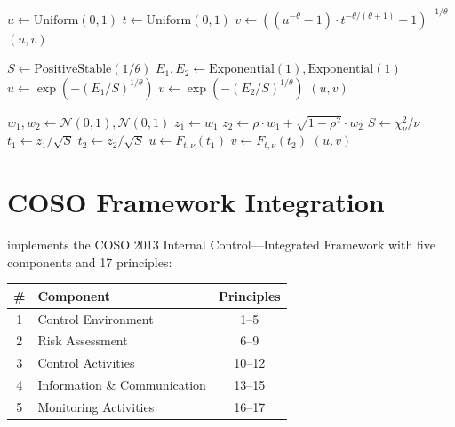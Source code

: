 \begin{algorithm}[H]
\caption{Clayton Copula Bivariate Sampling}
\label{alg:clayton}
\SetAlgoLined
{}
$u \gets \text{Uniform}(0, 1)$\;
$t \gets \text{Uniform}(0, 1)$\;
$v \gets \left((u^{-\theta} - 1) \cdot t^{-\theta/(\theta+1)} + 1\right)^{-1/\theta}$\;
\Return $(u, v)$\;
\end{algorithm}

\begin{algorithm}[H]
\caption{Gumbel Copula Bivariate Sampling (Marshall-Olkin)}
\label{alg:gumbel}
\SetAlgoLined
{}
$S \gets \text{PositiveStable}(1/\theta)$\;
$E_1, E_2 \gets \text{Exponential}(1), \text{Exponential}(1)$\;
$u \gets \exp(-(E_1 / S)^{1/\theta})$\;
$v \gets \exp(-(E_2 / S)^{1/\theta})$\;
\Return $(u, v)$\;
\end{algorithm}

\begin{algorithm}[H]
\caption{Student-$t$ Copula Bivariate Sampling}
\label{alg:student_t}
\SetAlgoLined
{}
$w_1, w_2 \gets \mathcal{N}(0,1), \mathcal{N}(0,1)$\;
$z_1 \gets w_1$\;
$z_2 \gets \rho \cdot w_1 + \sqrt{1 - \rho^2} \cdot w_2$\;
$S \gets \chi^2_\nu / \nu$\;
$t_1 \gets z_1 / \sqrt{S}$\;
$t_2 \gets z_2 / \sqrt{S}$\;
$u \gets F_{t,\nu}(t_1)$\;
$v \gets F_{t,\nu}(t_2)$\;
\Return $(u, v)$\;
\end{algorithm}

\section{COSO Framework Integration}
\label{app:coso}

\system{} implements the COSO 2013 Internal Control---Integrated
Framework with five components and 17 principles:

\begin{center}
\small
\begin{tabular}{clc}
\toprule
\textbf{\#} & \textbf{Component} & \textbf{Principles} \\
\midrule
1 & Control Environment               & 1--5 \\
2 & Risk Assessment                   & 6--9 \\
3 & Control Activities                & 10--12 \\
4 & Information \& Communication      & 13--15 \\
5 & Monitoring Activities             & 16--17 \\
\bottomrule
\end{tabular}
\end{center}

